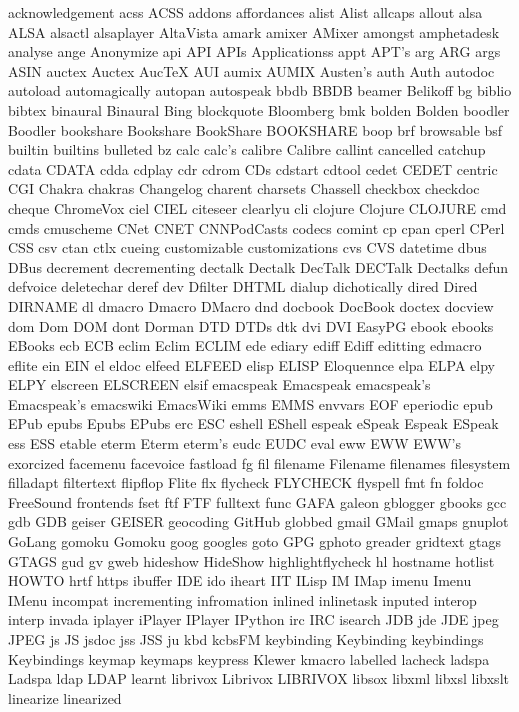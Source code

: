 acknowledgement
acss
ACSS
addons
affordances
alist
Alist
allcaps
allout
alsa
ALSA
alsactl
alsaplayer
AltaVista
amark
amixer
AMixer
amongst
amphetadesk
analyse
ange
Anonymize
api
API
APIs
Applicationss
appt
APT's
arg
ARG
args
ASIN
auctex
Auctex
AucTeX
AUI
aumix
AUMIX
Austen's
auth
Auth
autodoc
autoload
automagically
autopan
autospeak
bbdb
BBDB
beamer
Belikoff
bg
biblio
bibtex
binaural
Binaural
Bing
blockquote
Bloomberg
bmk
bolden
Bolden
boodler
Boodler
bookshare
Bookshare
BookShare
BOOKSHARE
boop
brf
browsable
bsf
builtin
builtins
bulleted
bz
calc
calc's
calibre
Calibre
callint
cancelled
catchup
cdata
CDATA
cdda
cdplay
cdr
cdrom
CDs
cdstart
cdtool
cedet
CEDET
centric
CGI
Chakra
chakras
Changelog
charent
charsets
Chassell
checkbox
checkdoc
cheque
ChromeVox
ciel
CIEL
citeseer
clearlyu
cli
clojure
Clojure
CLOJURE
cmd
cmds
cmuscheme
CNet
CNET
CNNPodCasts
codecs
comint
cp
cpan
cperl
CPerl
CSS
csv
ctan
ctlx
cueing
customizable
customizations
cvs
CVS
datetime
dbus
DBus
decrement
decrementing
dectalk
Dectalk
DecTalk
DECTalk
Dectalks
defun
defvoice
deletechar
deref
dev
Dfilter
DHTML
dialup
dichotically
dired
Dired
DIRNAME
dl
dmacro
Dmacro
DMacro
dnd
docbook
DocBook
doctex
docview
dom
Dom
DOM
dont
Dorman
DTD
DTDs
dtk
dvi
DVI
EasyPG
ebook
ebooks
EBooks
ecb
ECB
eclim
Eclim
ECLIM
ede
ediary
ediff
Ediff
editting
edmacro
eflite
ein
EIN
el
eldoc
elfeed
ELFEED
elisp
ELISP
Eloquennce
elpa
ELPA
elpy
ELPY
elscreen
ELSCREEN
elsif
emacspeak
Emacspeak
emacspeak's
Emacspeak's
emacswiki
EmacsWiki
emms
EMMS
envvars
EOF
eperiodic
epub
EPub
epubs
Epubs
EPubs
erc
ESC
eshell
EShell
espeak
eSpeak
Espeak
ESpeak
ess
ESS
etable
eterm
Eterm
eterm's
eudc
EUDC
eval
eww
EWW
EWW's
exorcized
facemenu
facevoice
fastload
fg
fil
filename
Filename
filenames
filesystem
filladapt
filtertext
flipflop
Flite
flx
flycheck
FLYCHECK
flyspell
fmt
fn
foldoc
FreeSound
frontends
fset
ftf
FTF
fulltext
func
GAFA
galeon
gblogger
gbooks
gcc
gdb
GDB
geiser
GEISER
geocoding
GitHub
globbed
gmail
GMail
gmaps
gnuplot
GoLang
gomoku
Gomoku
goog
googles
goto
GPG
gphoto
greader
gridtext
gtags
GTAGS
gud
gv
gweb
hideshow
HideShow
highlightflycheck
hl
hostname
hotlist
HOWTO
hrtf
https
ibuffer
IDE
ido
iheart
IIT
ILisp
IM
IMap
imenu
Imenu
IMenu
incompat
incrementing
infromation
inlined
inlinetask
inputed
interop
interp
invada
iplayer
iPlayer
IPlayer
IPython
irc
IRC
isearch
JDB
jde
JDE
jpeg
JPEG
js
JS
jsdoc
jss
JSS
ju
kbd
kcbsFM
keybinding
Keybinding
keybindings
Keybindings
keymap
keymaps
keypress
Klewer
kmacro
labelled
lacheck
ladspa
Ladspa
ldap
LDAP
learnt
librivox
Librivox
LIBRIVOX
libsox
libxml
libxsl
libxslt
linearize
linearized
